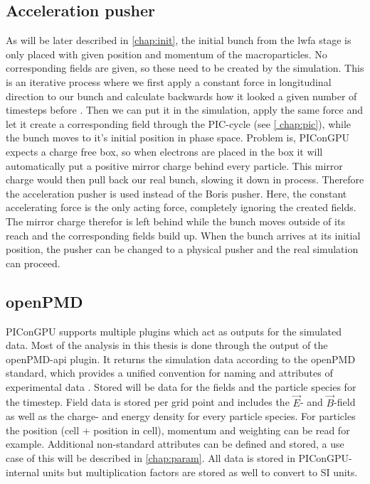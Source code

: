 \documentclass[bachelor_thesis]{subfiles}
\begin{document}
\subsection{Acceleration pusher} \label{chap:accpush}
As will be later described in \autoref{chap:init}, the initial bunch from the \gls{lwfa} stage is only placed with given position and momentum of the macroparticles.
No corresponding fields are given, so these need to be created by the simulation. This is an iterative process where we first apply a constant force in longitudinal direction to our bunch and calculate backwards how it looked a given number of timesteps before \cite{Huebl2014}.
Then we can put it in the simulation, apply the same force and let it create a corresponding field through the PIC-cycle (see \autoref{	chap:pic}), while the bunch moves to it's initial position in phase space. 
Problem is, PIConGPU expects a charge free box, so when electrons are placed in the box it will automatically put a positive mirror charge behind every particle. This mirror charge would then pull back our real 
bunch, slowing it down in process. Therefore the acceleration pusher is used instead of the Boris pusher. Here, the constant accelerating force is the only acting force, completely ignoring the created fields.
The mirror charge therefor is left behind while the bunch moves outside of its reach and the corresponding fields build up. When the bunch arrives at its initial position, the pusher can be changed to a physical pusher and
the real simulation can proceed.


\subsection{openPMD}
PIConGPU supports multiple plugins which act as outputs for the simulated data. Most of the analysis in this thesis is done through the output of the openPMD-api \cite{openPMDAPI} plugin.
It returns the simulation data according to the openPMD standard, which provides a unified convention for naming and attributes of experimental data \cite{openPMDstandard}.
Stored will be data for the fields and the particle species for the timestep. Field data is stored per grid point and includes the $\vec{E}$- and $\vec{B}$-field as well as the charge- and energy density for every particle species.
For particles the position (cell + position in cell), momentum and weighting can be read for example. Additional non-standard attributes can be defined and stored, a use case of this will be described in \autoref{chap:param}.
All data is stored in PIConGPU-internal units but multiplication factors are stored as well to convert to SI units.
\end{document}

